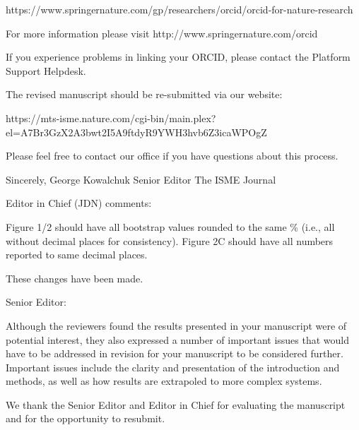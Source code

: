 \documentclass[11pt,]{article}
\begin{document}
\begin{blockquote}
https://www.springernature.com/gp/researchers/orcid/orcid-for-nature-research

For more information please visit http://www.springernature.com/orcid

If you experience problems in linking your ORCID, please contact the
Platform Support Helpdesk.

The revised manuscript should be re-submitted via our website:

https://mts-isme.nature.com/cgi-bin/main.plex?el=A7Br3GzX2A3bwt2I5A9ftdyR9YWH3hvb6Z3icaWPOgZ

Please feel free to contact our office if you have questions about this
process.

Sincerely, George Kowalchuk Senior Editor The ISME Journal
\end{blockquote}

\begin{blockquote}
Editor in Chief (JDN) comments:
\end{blockquote}

\begin{blockquote}
Figure 1/2 should have all bootstrap values rounded to the same \%
(i.e., all without decimal places for consistency). Figure 2C should
have all numbers reported to same decimal places.
\end{blockquote}

These changes have been made.

\begin{blockquote}
Senior Editor:

Although the reviewers found the results presented in your manuscript
were of potential interest, they also expressed a number of important
issues that would have to be addressed in revision for your manuscript
to be considered further. Important issues include the clarity and
presentation of the introduction and methods, as well as how results are
extrapoled to more complex systems.
\end{blockquote}

We thank the Senior Editor and Editor in Chief for evaluating the
manuscript and for the opportunity to resubmit.
\end{document}
